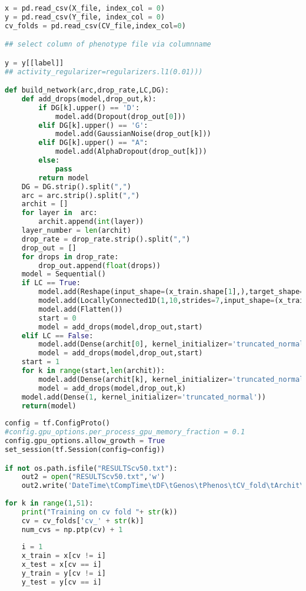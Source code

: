 \begin{lstlisting}[language=Python]
        
x = pd.read_csv(X_file, index_col = 0)
y = pd.read_csv(Y_file, index_col = 0)
cv_folds = pd.read_csv(CV_file,index_col=0)

## select column of phenotype file via columnname

y = y[[label]]
## activity_regularizer=regularizers.l1(0.01)))

def build_network(arc,drop_rate,LC,DG):
    def add_drops(model,drop_out,k):
        if DG[k].upper() == 'D':
            model.add(Dropout(drop_out[0]))
        elif DG[k].upper() == 'G':
            model.add(GaussianNoise(drop_out[k]))
        elif DG[k].upper() == "A":
            model.add(AlphaDropout(drop_out[k]))
        else:
            pass
        return model    
    DG = DG.strip().split(",")
    arc = arc.strip().split(",")
    archit = []
    for layer in  arc:
        archit.append(int(layer))
    layer_number = len(archit)        
    drop_rate = drop_rate.strip().split(",")
    drop_out = []
    for drops in drop_rate:
        drop_out.append(float(drops)) 
    model = Sequential()
    if LC == True:
        model.add(Reshape(input_shape=(x_train.shape[1],),target_shape=(x_train.shape[1],1)))
        model.add(LocallyConnected1D(1,10,strides=7,input_shape=(x_train.shape[1],1)))
        model.add(Flatten())
        start = 0
        model = add_drops(model,drop_out,start)
    elif LC == False:
        model.add(Dense(archit[0], kernel_initializer='truncated_normal', activation=act, input_shape=(x_train.shape[1],)))
        model = add_drops(model,drop_out,start)
    start = 1
    for k in range(start,len(archit)):
        model.add(Dense(archit[k], kernel_initializer='truncated_normal', activation=act))
        model = add_drops(model,drop_out,k)
    model.add(Dense(1, kernel_initializer='truncated_normal'))
    return(model)
     
config = tf.ConfigProto()
#config.gpu_options.per_process_gpu_memory_fraction = 0.1
config.gpu_options.allow_growth = True
set_session(tf.Session(config=config))

if not os.path.isfile("RESULTScv50.txt"):
    out2 = open("RESULTScv50.txt",'w')
    out2.write('DateTime\tCompTime\tDF\tGenos\tPhenos\tCV_fold\tArchit\tConv\tActFun\tEpochs\tdrop_rate\tAccuracy\n' )
    
for k in range(1,51):
    print("Training on cv fold "+ str(k))
    cv = cv_folds['cv_' + str(k)]
    num_cvs = np.ptp(cv) + 1
    
    i = 1
    x_train = x[cv != i] 
    x_test = x[cv == i] 
    y_train = y[cv != i]
    y_test = y[cv == i]


\end{lstlisting}
